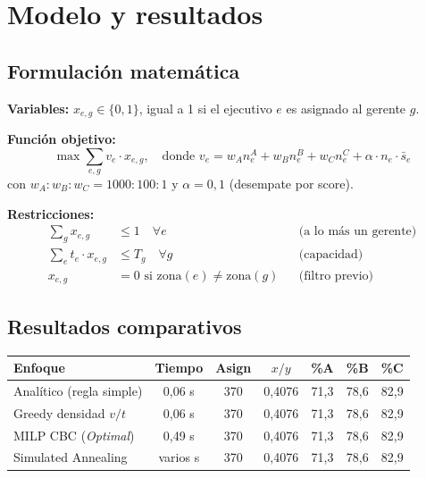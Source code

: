 \documentclass[11pt,a4paper]{article}
\newcommand{\rowamarillo}{\rowcolor{bcoamarilloclaro!30}}
\begin{document}
\section{Modelo y resultados}

\subsection{Formulación matemática}

\textbf{Variables:} $x_{e,g} \in \{0,1\}$, igual a 1 si el ejecutivo $e$ es asignado al gerente $g$.

\textbf{Función objetivo:}
\begin{equation*}
\max \sum_{e,g} v_e \cdot x_{e,g}, \quad \text{donde } v_e = w_A n^A_e + w_B n^B_e + w_C n^C_e + \alpha \cdot n_e \cdot \bar{s}_e
\end{equation*}
con $w_A : w_B : w_C = 1000 : 100 : 1$ y $\alpha = 0,1$ (desempate por score).

\textbf{Restricciones:}
\begin{align*}
\sum_g x_{e,g} & \le 1 \quad \forall e \quad &&\text{(a lo más un gerente)} \\
\sum_e t_e \cdot x_{e,g} & \le T_g \quad \forall g \quad &&\text{(capacidad)} \\
x_{e,g} &= 0 \text{ si zona}(e) \ne \text{zona}(g) &&\text{(filtro previo)}
\end{align*}

\subsection{Resultados comparativos}

\begin{center}
\renewcommand{\arraystretch}{1.25}
\begin{tabular}{l c c c c c c}
\toprule
\rowcolor{bconegro}
\textbf{\color{bcoamarillo}Enfoque} & \textbf{\color{bcoamarillo}Tiempo} & \textbf{\color{bcoamarillo}Asign} & \textbf{\color{bcoamarillo}$x/y$} & \textbf{\color{bcoamarillo}\%A} & \textbf{\color{bcoamarillo}\%B} & \textbf{\color{bcoamarillo}\%C} \\
\midrule
\rowamarillo Analítico (regla simple) & 0,06 s & 370 & 0,4076 & 71,3 & 78,6 & 82,9 \\
Greedy densidad $v/t$ & 0,06 s & 370 & 0,4076 & 71,3 & 78,6 & 82,9 \\
\rowamarillo MILP CBC (\emph{Optimal}) & 0,49 s & 370 & 0,4076 & 71,3 & 78,6 & 82,9 \\
Simulated Annealing & varios s & 370 & 0,4076 & 71,3 & 78,6 & 82,9 \\
\bottomrule
\end{tabular}
\end{center}
\end{document}
